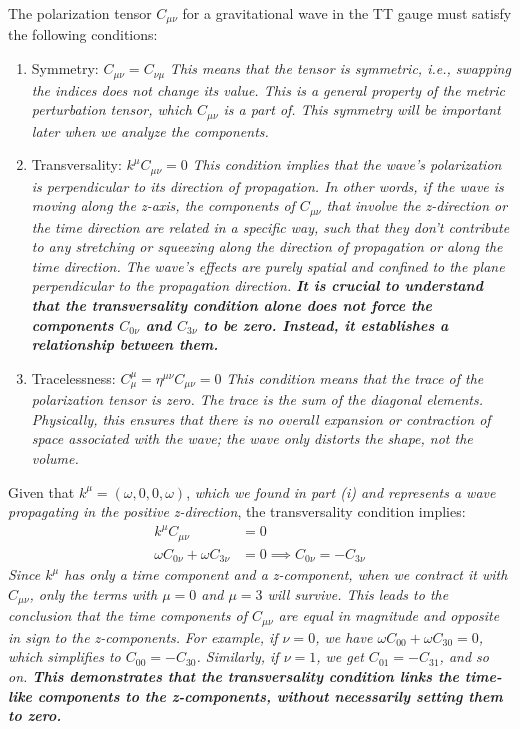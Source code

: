The polarization tensor $C_{\mu \nu}$ for a gravitational wave in the TT gauge must satisfy the following conditions:
\begin{enumerate}
    \item Symmetry: $C_{\mu \nu} = C_{\nu \mu}$ \emph{This means that the tensor is symmetric, i.e., swapping the indices does not change its value. This is a general property of the metric perturbation tensor, which $C_{\mu\nu}$ is a part of. This symmetry will be important later when we analyze the components.}
    \item Transversality: $k^{\mu} C_{\mu \nu} = 0$ \emph{This condition implies that the wave's polarization is perpendicular to its direction of propagation. In other words, if the wave is moving along the z-axis, the components of $C_{\mu\nu}$ that involve the z-direction or the time direction are related in a specific way, such that they don't contribute to any stretching or squeezing along the direction of propagation or along the time direction. The wave's effects are purely spatial and confined to the plane perpendicular to the propagation direction.} \emph{\textbf{It is crucial to understand that the transversality condition alone does not force the components $C_{0\nu}$ and $C_{3\nu}$ to be zero. Instead, it establishes a relationship between them.}}
    \item Tracelessness: $C^{\mu}_{\mu} = \eta^{\mu \nu} C_{\mu \nu} = 0$ \emph{This condition means that the trace of the polarization tensor is zero. The trace is the sum of the diagonal elements. Physically, this ensures that there is no overall expansion or contraction of space associated with the wave; the wave only distorts the shape, not the volume.}
\end{enumerate}
Given that $k^{\mu} = (\omega, 0, 0, \omega)$, \emph{which we found in part (i) and represents a wave propagating in the positive z-direction}, the transversality condition implies:
\begin{align}
k^{\mu}C_{\mu \nu} &= 0 \\
\omega C_{0\nu} + \omega C_{3\nu} &= 0 \implies C_{0\nu} = -C_{3\nu}
\end{align}
\emph{Since $k^{\mu}$ has only a time component and a z-component, when we contract it with $C_{\mu\nu}$, only the terms with $\mu=0$ and $\mu=3$ will survive. This leads to the conclusion that the time components of $C_{\mu\nu}$ are equal in magnitude and opposite in sign to the z-components.}
\emph{For example, if $\nu=0$, we have $\omega C_{00} + \omega C_{30} = 0$, which simplifies to $C_{00} = -C_{30}$. Similarly, if $\nu=1$, we get $C_{01} = -C_{31}$, and so on. \textbf{This demonstrates that the transversality condition links the time-like components to the z-components, without necessarily setting them to zero.}}


